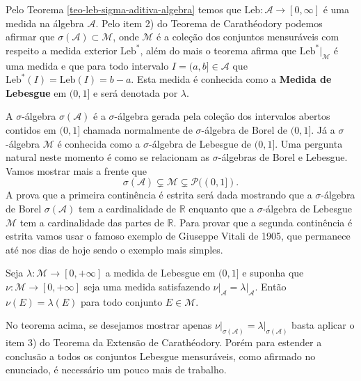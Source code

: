 Pelo Teorema \ref{teo-leb-sigma-aditiva-algebra} 
temos que $\mathrm{Leb}:\mathcal{A}\to [0,\infty]$
é uma medida na álgebra $\mathcal{A}$.
Pelo item 2) do Teorema de Carathéodory podemos
afirmar que  $\sigma(\mathcal{A})\subset \mathcal{M}$,
onde $\mathcal{M}$ é a coleção dos conjuntos 
mensuráveis com respeito a 
medida exterior $\mathrm{Leb}^*$,
além do mais o teorema afirma que $\mathrm{Leb}^*\big|_{\mathcal{M}}$
é uma medida e que para todo intervalo $I=(a,b]\in\mathcal{A}$ 
que $\mathrm{Leb}^*(I)=\mathrm{Leb}(I)=b-a$.
Esta medida é conhecida como a {\bf Medida de Lebesgue} 
em $(0,1]$ e será denotada por $\lambda$.

A $\sigma$-álgebra $\sigma(\mathcal{A})$ é a $\sigma$-álgebra
gerada pela coleção dos intervalos abertos contidos em $(0,1]$
chamada normalmente de $\sigma$-álgebra de Borel de $(0,1]$.
Já a $\sigma$-álgebra $\mathcal{M}$ é conhecida
como a $\sigma$-álgebra de Lebesgue de $(0,1]$.
Uma pergunta natural neste momento é como se relacionam 
as $\sigma$-álgebras de Borel e Lebesgue. Vamos mostrar 
mais a frente que 
\[
\sigma(\mathcal{A})
\subsetneq 
\mathcal{M}
\subsetneq 
\mathcal{P}((0,1]).
\]
A prova que a primeira continência é estrita 
será dada mostrando que a $\sigma$-álgebra 
de Borel $\sigma(\mathcal{A})$ 
tem a cardinalidade de $\mathbb{R}$ 
enquanto que a $\sigma$-álgebra de Lebesgue 
$\mathcal{M}$ tem a cardinalidade das 
partes de $\mathbb{R}$.
Para provar que a segunda continência é estrita
vamos usar o famoso exemplo de Giuseppe Vitali
de 1905, que permanece até nos dias de hoje 
sendo o exemplo mais simples.


\begin{teorema}
	Seja $\lambda:\mathcal{M}\to [0,+\infty]$ a medida de Lebesgue em $(0,1]$
	e suponha que $\nu:\mathcal{M}\to [0,+\infty]$ seja uma medida satisfazendo 
	$\nu\big|_{\mathcal{A}} = \lambda\big|_{\mathcal{A}}$.
	Então $\nu(E) = \lambda(E)$ para todo conjunto $E\in \mathcal{M}$. 
\end{teorema}

\begin{observacao}
	No teorema acima, se desejamos mostrar apenas 
	$\nu\big|_{\sigma(\mathcal{A})} = \lambda\big|_{\sigma(\mathcal{A})}$
	basta aplicar o item 3) do Teorema da Extensão de Carathéodory. 
	Porém para estender a conclusão a 
	todos os conjuntos Lebesgue mensuráveis, como afirmado no enunciado,
	é necessário um pouco mais de trabalho.	
\end{observacao}










